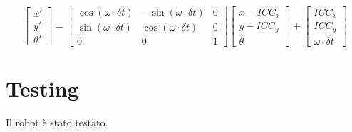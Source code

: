 \begin{displaymath}
    \begin{bmatrix} x' \\ y' \\ \theta'  \end{bmatrix}
    =
    \begin{bmatrix}
        \cos(\omega \cdot \delta t) & -\sin(\omega \cdot \delta t) & 0 \\
        \sin(\omega \cdot \delta t) & \cos(\omega \cdot \delta t) & 0 \\
        0 & 0 & 1
    \end{bmatrix}
    \begin{bmatrix}
        x - ICC_x \\
        y - ICC_y \\
        \theta
    \end{bmatrix}
    +
    \begin{bmatrix}
        ICC_x \\
        ICC_y \\
        \omega \cdot \delta t
   \end{bmatrix}
\end{displaymath}

\section{Testing}
Il robot è stato testato.
